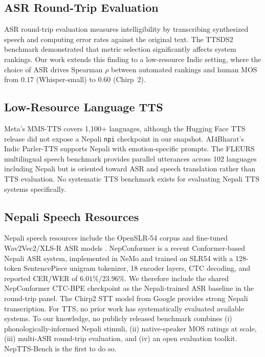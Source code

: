 \documentclass[11pt]{article}
\begin{document}
\subsection{ASR Round-Trip Evaluation}
ASR round-trip evaluation measures intelligibility by transcribing synthesized speech and computing error rates against the original text. The TTSDS2 benchmark \citep{minixhofer2025ttsds} demonstrated that metric selection significantly affects system rankings. Our work extends this finding to a low-resource Indic setting, where the choice of ASR drives Spearman $\rho$ between automated rankings and human MOS from $0.17$ (Whisper-small) to $0.60$ (Chirp~2).

\subsection{Low-Resource Language TTS}
Meta's MMS-TTS \citep{pratap2023mms} covers 1,100+ languages, although the Hugging Face TTS release did not expose a Nepali \texttt{npi} checkpoint in our snapshot. AI4Bharat's Indic Parler-TTS supports Nepali with emotion-specific prompts. The FLEURS multilingual speech benchmark \citep{conneau2022fleurs} provides parallel utterances across 102 languages including Nepali but is oriented toward ASR and speech translation rather than TTS evaluation. No systematic TTS benchmark exists for evaluating Nepali TTS systems specifically.

\subsection{Nepali Speech Resources}
Nepali speech resources include the OpenSLR-54 corpus and fine-tuned Wav2Vec2/XLS-R ASR models \citep{gagan2023xlsr}. NepConformer \citep{poudel2026nepconformer} is a recent Conformer-based Nepali ASR system, implemented in NeMo and trained on SLR54 with a 128-token SentencePiece unigram tokenizer, 18 encoder layers, CTC decoding, and reported CER/WER of $6.01\%$/$23.96\%$. We therefore include the shared NepConformer CTC-BPE checkpoint as the Nepali-trained ASR baseline in the round-trip panel. The Chirp2 STT model from Google provides strong Nepali transcription. For TTS, no prior work has systematically evaluated available systems. To our knowledge, no publicly released benchmark combines (i) phonologically-informed Nepali stimuli, (ii) native-speaker MOS ratings at scale, (iii) multi-ASR round-trip evaluation, and (iv) an open evaluation toolkit. NepTTS-Bench is the first to do so.
\end{document}
